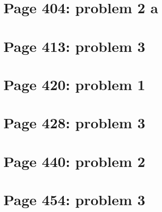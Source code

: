 \documentclass[]{article}
\begin{document}
\section{Page 404: problem 2 a}\label{page-404-problem-2-a}

\section{Page 413: problem 3}\label{page-413-problem-3}

\section{Page 420: problem 1}\label{page-420-problem-1}

\section{Page 428: problem 3}\label{page-428-problem-3}

\section{Page 440: problem 2}\label{page-440-problem-2}

\section{Page 454: problem 3}\label{page-454-problem-3}
\end{document}
